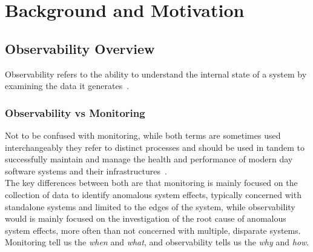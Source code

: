 %
%
\chapter{Background and Motivation} \label{ch:background}


\section{Observability Overview}\label{sec:observability-overview}
Observability refers to the ability to understand the internal state of a system by examining the data it generates~\cite{ibm_observability}.\\

\subsection{Observability vs Monitoring}\label{subsec:observability-vs-monitoring}
Not to be confused with monitoring, while both terms are sometimes used interchangeably they refer to distinct
processes and should be used in tandem to successfully maintain and manage the health and performance of modern day
software systems and their infrastructures~\cite{aws_observability_vs_monitoring}.\\

The key differences between both are that monitoring is mainly focused on the collection of data to identify
anomalous system effects, typically concerned with standalone systems and limited to the edges of the system, while
observability would is mainly focused on the investigation of the root cause of anomalous system effects, more often
than not concerned with multiple, disparate systems.
Monitoring tell us the \textit{when} and \textit{what}, and observability tells us the \textit{why} and \textit{how}.\\

